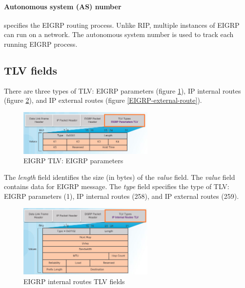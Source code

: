 \paragraph{Autonomous system (AS) number}specifies the EIGRP routing process. Unlike RIP, multiple instances of EIGRP can run on a network. The autonomous system number is used to track each running EIGRP process.

\subsection{TLV fields}

There are three types of TLV: EIGRP parameters (figure \ref{EIGRP-parameters}), IP internal routes (figure \ref{EIGRP-internal-route}), and IP external routes (figure \ref{EIGRP-external-route}).\\

\begin{figure}[hbtp]
\centering
\includegraphics[width=0.6\textwidth]{pictures/EIGRP-parameters.png}
\caption{EIGRP TLV: EIGRP parameters} \label{EIGRP-parameters}
\end{figure}

The \emph{length} field identifies the size (in bytes) of the \emph{value} field. The \emph{value} field contains data for EIGRP message. The \emph{type} field specifies the type of TLV: EIGRP parameters (1), IP internal routes (258), and IP external routes (259).\\

\begin{figure}[hbtp]
\centering
\includegraphics[width=0.6\textwidth]{pictures/EIGRP-internal-route.png}
\caption{EIGRP internal routes TLV fields} \label{EIGRP-internal-route}
\end{figure}

